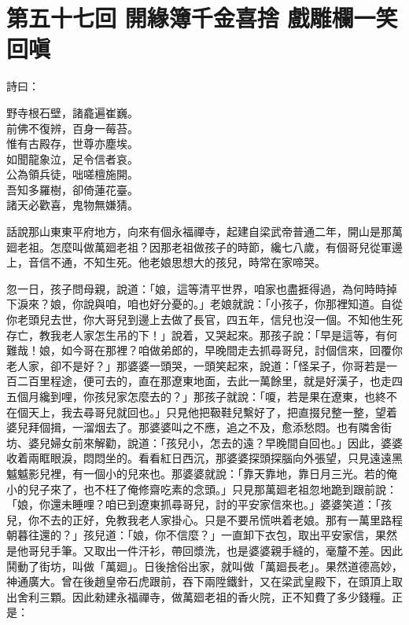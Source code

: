 
\chapter*{第五十七回 開緣簿千金喜捨 戲雕欄一笑回嗔}


詩曰：

\begin{myquote}
野寺根石壁，諸龕遍崔巍。\\前佛不復辨，百身一莓苔。\\惟有古殿存，世尊亦塵埃。\\如聞龍象泣，足令信者哀。\\公為領兵徒，咄嗟檀施開。\\吾知多羅樹，卻倚蓮花臺。\\諸天必歡喜，鬼物無嫌猜。
\end{myquote}

話說那山東東平府地方，向來有個永福禪寺，起建自梁武帝普通二年，開山是那萬廻老祖。怎麼叫做萬廻老祖？因那老祖做孩子的時節，纔七八歲，有個哥兒從軍邊上，音信不通，不知生死。他老娘思想大的孩兒，時常在家啼哭。

忽一日，孩子問母親，說道：「娘，這等清平世界，咱家也盡捱得過，為何時時掉下淚來？娘，你說與咱，咱也好分憂的。」老娘就說：「小孩子，你那裡知道。自從你老頭兒去世，你大哥兒到邊上去做了長官，四五年，信兒也沒一個。不知他生死存亡，教我老人家怎生吊的下！」說着，又哭起來。那孩子說：「早是這等，有何難哉！娘，如今哥在那裡？咱做弟郎的，早晚間走去抓尋哥兒，討個信來，回覆你老人家，卻不是好？」那婆婆一頭哭，一頭笑起來，說道：「怪呆子，你哥若是一百二百里程途，便可去的，直在那遼東地面，去此一萬餘里，就是好漢子，也走四五個月纔到哩，你孩兒家怎麼去的？」那孩子就說：「嗄，若是果在遼東，也終不在個天上，我去尋哥兒就回也。」只見他把靸鞋兒繫好了，把直掇兒整一整，望着婆兒拜個揖，一溜烟去了。那婆婆叫之不應，追之不及，愈添愁悶。也有隣舍街坊、婆兒婦女前來解勸，說道：「孩兒小，怎去的遠？早晚間自回也。」因此，婆婆收着兩眶眼淚，悶悶坐的。看看紅日西沉，那婆婆探頭探腦向外張望，只見遠遠黑魆魆影兒裡，有一個小的兒來也。那婆婆就說：「靠天靠地，靠日月三光。若的俺小的兒子來了，也不枉了俺修齋吃素的念頭。」只見那萬廻老祖忽地跪到跟前說：「娘，你還未睡哩？咱已到遼東抓尋哥兒，討的平安家信來也。」{}婆婆笑道：「孩兒，你不去的正好，免教我老人家掛心。只是不要吊慌哄着老娘。那有一萬里路程朝暮往還的？」孩兒道：「娘，你不信麼？」一直卸下衣包，取出平安家信，果然是他哥兒手筆。又取出一件汗衫，帶回漿洗，也是婆婆親手縫的，毫釐不差。因此鬨動了街坊，叫做「萬廻」。日後捨俗出家，就叫做「萬廻長老」。果然道德高妙，神通廣大。曾在後趙皇帝石虎跟前，吞下兩陞鐵針，又在梁武皇殿下，在頭頂上取出舍利三顆。因此勑建永福禪寺，做萬廻老祖的香火院，正不知費了多少錢糧。正是：

